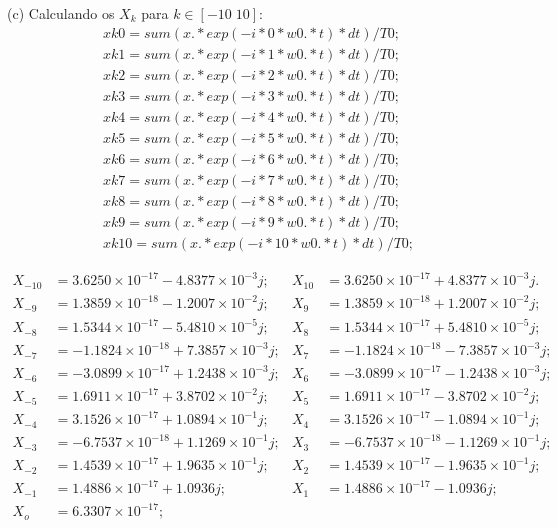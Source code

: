 \documentclass{article}
\begin{document}
\vspace{\baselineskip}

(c) Calculando os $X_{k}$ para $k \in [-10\;10]$:
\begin{align*}
    xk0 = sum(x.*exp(-i*0*w0.*t)*dt)/T0;\\
    xk1 = sum(x.*exp(-i*1*w0.*t)*dt)/T0;\\
    xk2 = sum(x.*exp(-i*2*w0.*t)*dt)/T0;\\
    xk3 = sum(x.*exp(-i*3*w0.*t)*dt)/T0;\\
    xk4 = sum(x.*exp(-i*4*w0.*t)*dt)/T0;\\
    xk5 = sum(x.*exp(-i*5*w0.*t)*dt)/T0;\\
    xk6 = sum(x.*exp(-i*6*w0.*t)*dt)/T0;\\
    xk7 = sum(x.*exp(-i*7*w0.*t)*dt)/T0;\\
    xk8 = sum(x.*exp(-i*8*w0.*t)*dt)/T0;\\
    xk9 = sum(x.*exp(-i*9*w0.*t)*dt)/T0;\\
    xk10 = sum(x.*exp(-i*10*w0.*t)*dt)/T0;
\end{align*}

\vspace{\baselineskip}

\begin{align*}
    X_{-10} &=  3.6250 \times 10^{-17} - 4.8377\times 10^{-3}j; & X_{10} &=  3.6250\times 10^{-17} + 4.8377\times 10^{-3}j.\\
    X_{-9} &=  1.3859\times 10^{-18} - 1.2007\times 10^{-2}j;   & X_{9} &=  1.3859\times 10^{-18} + 1.2007\times 10^{-2}j;\\
    X_{-8} &=  1.5344\times 10^{-17} - 5.4810\times 10^{-5}j;   & X_{8} &=  1.5344\times 10^{-17} + 5.4810\times 10^{-5}j;\\
    X_{-7} &= -1.1824\times 10^{-18} + 7.3857\times 10^{-3}j;   & X_{7} &= -1.1824\times 10^{-18} - 7.3857\times 10^{-3}j;\\
    X_{-6} &= -3.0899\times 10^{-17} + 1.2438\times 10^{-3}j;   & X_{6} &= -3.0899\times 10^{-17} - 1.2438\times 10^{-3}j;\\
    X_{-5} &=  1.6911\times 10^{-17} + 3.8702\times 10^{-2}j;   & X_{5} &=  1.6911\times 10^{-17} - 3.8702\times 10^{-2}j;\\
    X_{-4} &=  3.1526\times 10^{-17} + 1.0894\times 10^{-1}j;   & X_{4} &=  3.1526\times 10^{-17} - 1.0894\times 10^{-1}j;\\
    X_{-3} &= -6.7537\times 10^{-18} + 1.1269\times 10^{-1}j;   & X_{3} &= -6.7537\times 10^{-18} - 1.1269\times 10^{-1}j;\\
    X_{-2} &=  1.4539\times 10^{-17} + 1.9635\times 10^{-1}j;   & X_{2} &=  1.4539\times 10^{-17} - 1.9635\times 10^{-1}j;\\
    X_{-1} &=  1.4886\times 10^{-17} + 1.0936j;                  & X_{1} &=  1.4886\times 10^{-17} - 1.0936j;\\
    X_{o} &= 6.3307\times 10^{-17}; &
\end{align*}
\end{document}
